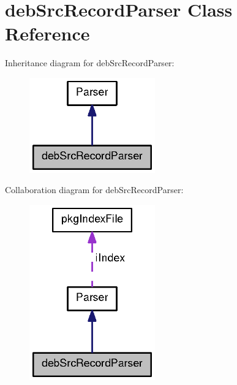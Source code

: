\section{deb\-Src\-Record\-Parser \-Class \-Reference}
\label{classdebSrcRecordParser}


\-Inheritance diagram for deb\-Src\-Record\-Parser\-:
\nopagebreak
\begin{figure}[H]
\begin{center}
\leavevmode
\includegraphics[width=154pt]{classdebSrcRecordParser__inherit__graph}
\end{center}
\end{figure}


\-Collaboration diagram for deb\-Src\-Record\-Parser\-:
\nopagebreak
\begin{figure}[H]
\begin{center}
\leavevmode
\includegraphics[width=154pt]{classdebSrcRecordParser__coll__graph}
\end{center}
\end{figure}
